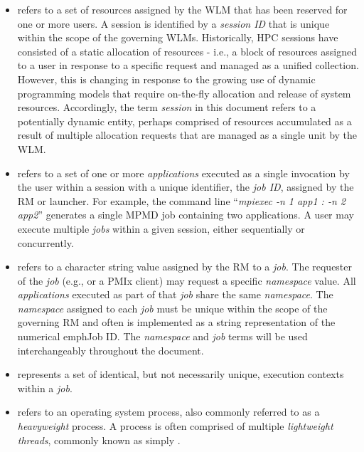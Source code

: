 \begin{itemize}

\item {} 
refers to a set of resources assigned by the \ac{WLM} that has been 
reserved for one or more users. 
A session is identified by a \emph{session ID} that is  
unique within the scope of the governing \acp{WLM}.
Historically, \ac{HPC} sessions have consisted of a static allocation of resources - i.e., a block of resources assigned to a user in response to a specific request and managed as a unified collection. However, this is changing in response to the growing use of dynamic programming models that require on-the-fly allocation and release of system resources. Accordingly, the term \emph{session} in this document refers to a potentially dynamic entity, perhaps comprised of resources accumulated as a result of multiple allocation requests that are managed as a single unit by the \ac{WLM}.

\item {} refers to a set of one or more \emph{applications} executed as a single invocation by the user within a session with a unique identifier, the \emph{job ID}, assigned by the \ac{RM} or launcher. For example, the command line ``\textit{mpiexec -n 1 app1 : -n 2 app2}'' generates a single \ac{MPMD} job containing two applications. A user may execute multiple \emph{jobs} within a given session, either sequentially or concurrently.

\item {} refers to a character string value assigned by the \ac{RM} to a \textit{job}.  The requester of the \textit{job} (e.g.,  or a \ac{PMIx} client) may request a specific \emph{namespace} value.  All \textit{applications} executed as part of that \textit{job} share the same \emph{namespace}. The \emph{namespace} assigned to each \emph{job} must be unique within the scope of the governing \ac{RM} and often is implemented as a string representation of the numerical emph{Job ID}. The \emph{namespace} and \emph{job} terms will be used interchangeably throughout the document.

\item {} represents a set of identical, but not necessarily unique,
execution contexts within a \emph{job}.

\item {} refers to an operating system process, also commonly referred to as a \emph{heavyweight} process. A process is often comprised of multiple \emph{lightweight threads}, commonly known as simply .


\end{itemize}
